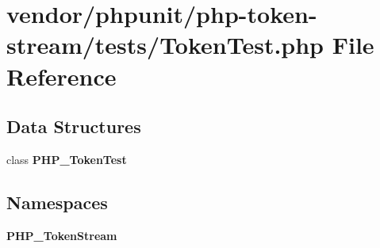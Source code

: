 \section{vendor/phpunit/php-\/token-\/stream/tests/\+Token\+Test.php File Reference}
\label{_token_test_8php}
\subsection*{Data Structures}
\begin{DoxyCompactItemize}
\item 
class {\bf P\+H\+P\+\_\+\+Token\+Test}
\end{DoxyCompactItemize}
\subsection*{Namespaces}
\begin{DoxyCompactItemize}
\item 
 {\bf P\+H\+P\+\_\+\+Token\+Stream}
\end{DoxyCompactItemize}
